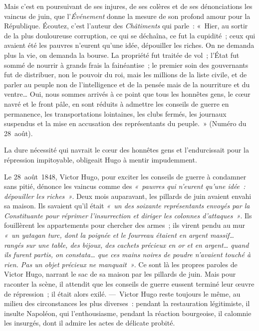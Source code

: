 \documentclass[french,twoside]{book} %
\begin{document}
Mais c’est en poursuivant de ses injures, de ses colères et de ses dénonciations les vaincus de juin, que l’\emph{Événement} donne la mesure de son profond amour pour la République. Écoutez, c’est l’auteur des \emph{Châtiments} qui parle : « Hier, au sortir de la plus douloureuse corruption, ce qui se déchaîna, ce fut la cupidité ; ceux qui avaient été les pauvres n’eurent qu’une idée, dépouiller les riches. On ne demanda plus la vie, on demanda la bourse. La propriété fut traitée de vol ; l’État fut sommé de nourrir à grands frais la fainéantise ; le premier soin des gouvernants fut de distribuer, non le pouvoir du roi, mais les millions de la liste civile, et de parler au peuple non de l’intelligence et de la pensée mais de la nourriture et du ventre… Oui, nous sommes arrivés à ce point que tous les honnêtes gens, le cœur navré et le front pâle, en sont réduits à admettre les conseils de guerre en permanence, les transportations lointaines, les clubs fermés, les journaux suspendus et la mise en accusation des représentants du peuple. » (Numéro du 28 août).\par
La dure nécessité qui navrait le cœur des honnêtes gens et l’endurcissait pour la répression impitoyable,  
\label{p31}obligeait Hugo à mentir impudemment.\par
Le 28 août 1848, Victor Hugo, pour exciter les conseils de guerre à condamner sans pitié, dénonce les vaincus comme des \emph{« pauvres qui n’eurent qu’une idée : dépouiller les riches »}. Deux mois auparavant, les pillards de juin avaient envahi sa maison. Ils savaient qu’il était \emph{« un des soixante représentants envoyés par la Constituante pour réprimer l’insurrection et diriger les colonnes d’attaques »}. Ils fouillèrent les appartements pour chercher des armes ; ils virent pendu au mur \emph{« un yatagan turc, dont la poignée et le fourreau étaient en argent massif… rangés sur une table, des bijoux, des cachets précieux en or et en argent… quand ils furent partis, on constata… que ces mains noires de poudre n’avaient touché à rien. Pas un objet précieux ne manquait »}. Ce sont là les propres paroles de Victor Hugo, narrant le sac de sa maison par les pillards de juin. Mais pour raconter la scène, il attendit que les conseils de guerre eussent terminé leur œuvre de répression ; il était alors exilé. — Victor Hugo reste toujours le même, au milieu des circonstances les plus diverses : pendant la restauration légitimiste, il insulte Napoléon, qui l’enthousiasme, pendant la réaction bourgeoise, il calomnie les insurgés, dont il admire les actes de délicate probité.\par
\end{document}

